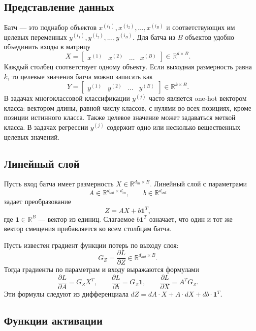 \documentclass{article}
\begin{document}
\subsection{Представление данных}

Батч --- это поднабор объектов
$x^{(i_1)}, x^{(i_2)}, \dots, x^{(i_B)}$ и соответствующих им
целевых переменных
$y^{(i_1)}, y^{(i_2)}, \dots, y^{(i_B)}$. Для батча из $B$
объектов удобно объединить входы в матрицу
\[
    X =
    \begin{bmatrix}
        x^{(1)} & x^{(2)} & \ldots & x^{(B)}
    \end{bmatrix}
    \in \mathbb{R}^{d \times B}.
\]
Каждый столбец соответствует одному объекту. Если выходная размерность
равна $k$, то целевые значения батча можно записать как
\[
    Y =
    \begin{bmatrix}
        y^{(1)} & y^{(2)} & \ldots & y^{(B)}
    \end{bmatrix}
    \in \mathbb{R}^{k \times B}.
\]
В задачах многоклассовой классификации $y^{(j)}$ часто является
one-hot вектором класса: вектором длины, равной числу классов, с
нулями во всех позициях, кроме позиции истинного класса. Также целевое
значение может задаваться меткой класса. В задачах регрессии
$y^{(j)}$ содержит одно или несколько вещественных целевых значений.

\subsection{Линейный слой}

Пусть вход батча имеет размерность $X \in
\mathbb{R}^{d_{in} \times B}$. Линейный слой с параметрами
\[
    A \in \mathbb{R}^{d_{out} \times d_{in}},
    \qquad
    b \in \mathbb{R}^{d_{out}}
\]
задает преобразование
\[
    Z = AX + b\mathbf{1}^{T},
\]
где $\mathbf{1} \in \mathbb{R}^{B}$ --- вектор из единиц. Слагаемое
$b\mathbf{1}^{T}$ означает, что один и тот же вектор смещения
прибавляется ко всем столбцам батча.

Пусть известен градиент функции потерь по выходу слоя:
\[
    G_Z =
    \frac{\partial L}{\partial Z}
    \in \mathbb{R}^{d_{out} \times B}.
\]
Тогда градиенты по параметрам и входу выражаются формулами
\[
    \frac{\partial L}{\partial A} = G_Z X^T,
    \qquad
    \frac{\partial L}{\partial b} = G_Z \mathbf{1},
    \qquad
    \frac{\partial L}{\partial X} = A^T G_Z.
\]
Эти формулы следуют из дифференциала
$dZ = dA \cdot X + A \cdot dX + db \cdot \mathbf{1}^{T}$.

\subsection{Функции активации}
\end{document}
